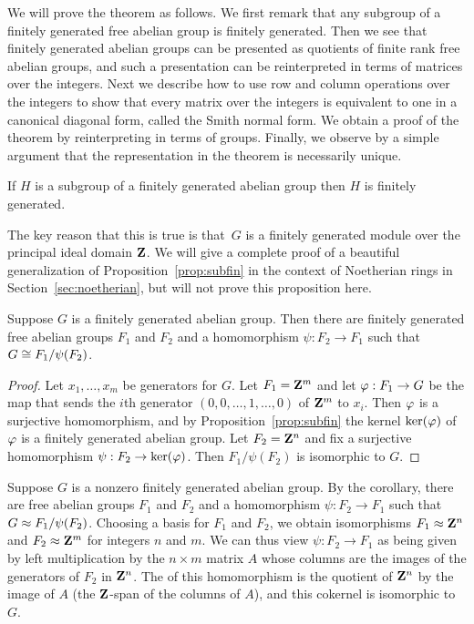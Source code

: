 We will prove the theorem as follows.  We first remark that any
subgroup of a finitely generated free abelian group is finitely
generated.  Then we see that finitely generated abelian groups can be
presented as quotients of finite rank free abelian groups, and such a
presentation can be reinterpreted in terms of matrices over the
integers.  Next we describe how to use row and column operations over
the integers to show that every matrix over the integers is equivalent
to one in a canonical diagonal form, called the Smith normal form.  We
obtain a proof of the theorem by reinterpreting  in
terms of groups.  Finally, we observe by a simple argument that
the representation in the theorem is necessarily unique. 

\begin{proposition}\label{prop:subfin}
If $H$ is a subgroup of a finitely generated abelian group then $H$
is finitely generated.
\end{proposition}
The key reason that this is true is that~$G$ is a finitely generated
module over the principal ideal domain $\mathbf{Z}$.  We will give a complete
proof of a beautiful generalization of Proposition~\ref{prop:subfin}
in the context of Noetherian rings in Section~\ref{sec:noetherian},
but will not prove this proposition here.

\begin{corollary}\label{cor:presentation}
Suppose $G$ is a finitely generated abelian group.  Then there are
finitely generated free abelian groups $F_1$ and $F_2$ and a homomorphism
$\psi:F_2 \to F_1$ such that
$G \cong F_1/\psi(F_2)$.
\end{corollary}
\begin{proof}
  Let $x_1,\ldots, x_m$ be generators for $G$.  Let $F_1=\mathbf{Z}^m$ and let
  $\varphi:F_1\to G$ be the map that sends the $i$th generator
  $(0,0,\ldots,1,\ldots,0)$ of $\mathbf{Z}^m$ to $x_i$.  Then $\varphi$ is a
  surjective homomorphism, and by Proposition~\ref{prop:subfin} the
  kernel $\ker(\varphi)$ of $\varphi$ is a finitely generated abelian
  group.  Let $F_2 = \mathbf{Z}^n$ and fix a surjective homomorphism $\psi:F_2
  \to \ker(\varphi)$.  Then $F_1 / \psi(F_2)$ is isomorphic to $G$.
\end{proof}

Suppose $G$ is a nonzero finitely generated abelian group.  By the
corollary, there are free abelian groups $F_1$ and $F_2$ and a
homomorphism $\psi:F_2 \to F_1$ such that $G\approx F_1/\psi(F_2)$.
Choosing a basis for $F_1$ and $F_2$, we obtain isomorphisms
$F_1\approx \mathbf{Z}^n$ and $F_2\approx \mathbf{Z}^m$ for integers $n$ and $m$.  We
can thus view $\psi:F_2\to F_1$ as being given by left multiplication
by the $n\times m$ matrix $A$ whose columns are the images of the
generators of $F_2$ in $\mathbf{Z}^n$.  The  of this
homomorphism is the quotient of $\mathbf{Z}^n$ by the image of $A$ (the
$\mathbf{Z}$-span of the columns of $A$), and this cokernel is isomorphic to
$G$.  

